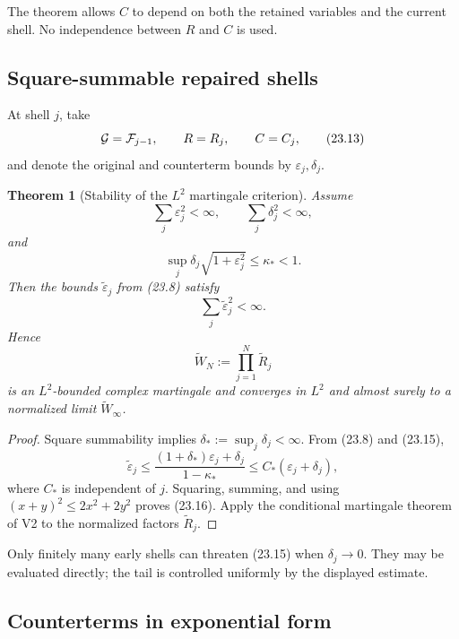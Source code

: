\documentclass[11pt]{article}
\newtheorem{theorem}{Theorem}[section]
\theoremstyle{remark}
\begin{document}
The theorem allows \(C\) to depend on both the retained variables and
the current shell.  No independence between \(R\) and \(C\) is used.

\subsection{Square-summable repaired shells}

At shell \(j\), take
\[
 {\cal G}={\cal F}_{j-1},\qquad
 R=R_j,\qquad C=C_j,                                      \tag{23.13}
\]
and denote the original and counterterm bounds by
\(\varepsilon_j,\delta_j\).

\begin{theorem}[Stability of the \(L^2\) martingale criterion]
\label{thm:v12v23-summability}
Assume
\[
 \sum_j\varepsilon_j^2<\infty,\qquad
 \sum_j\delta_j^2<\infty,                                  \tag{23.14}
\]
and
\[
 \sup_j\delta_j\sqrt{1+\varepsilon_j^2}
 \le\kappa_*<1.                                             \tag{23.15}
\]
Then the bounds \(\widetilde\varepsilon_j\) from (23.8) satisfy
\[
                         \sum_j\widetilde\varepsilon_j^2<\infty.
                                                               \tag{23.16}
\]
Hence
\[
                         \widetilde W_N
 :=\prod_{j=1}^N\widetilde R_j                              \tag{23.17}
\]
is an \(L^2\)-bounded complex martingale and converges in \(L^2\) and
almost surely to a normalized limit \(\widetilde W_\infty\).
\end{theorem}

\begin{proof}
Square summability implies
\(\delta_*:=\sup_j\delta_j<\infty\).  From (23.8) and (23.15),
\[
 \widetilde\varepsilon_j
 \le
 \frac{(1+\delta_*)\varepsilon_j+\delta_j}{1-\kappa_*}
 \le C_*(\varepsilon_j+\delta_j),                           \tag{23.18}
\]
where \(C_*\) is independent of \(j\).  Squaring, summing, and using
\((x+y)^2\le2x^2+2y^2\) proves (23.16).  Apply the conditional
martingale theorem of V2 to the normalized factors
\(\widetilde R_j\).
\end{proof}

Only finitely many early shells can threaten (23.15) when
\(\delta_j\to0\).  They may be evaluated directly; the tail is
controlled uniformly by the displayed estimate.

\subsection{Counterterms in exponential form}
\end{document}
